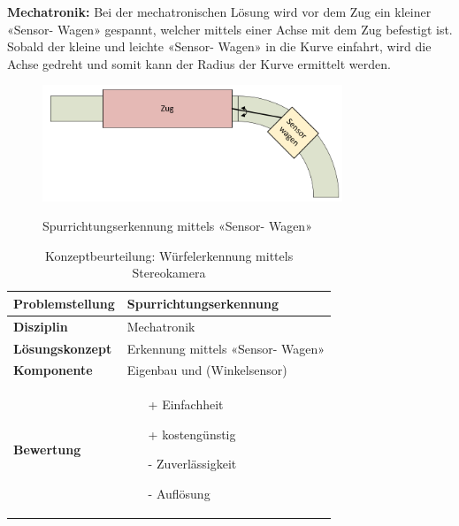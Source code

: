 \documentclass[../../main.tex]{subfiles}
\begin{document}
    \textbf{Mechatronik: }
    Bei der mechatronischen Lösung wird vor dem Zug ein kleiner «Sensor- Wagen» gespannt, welcher mittels einer Achse
    mit dem Zug befestigt ist. Sobald der kleine und leichte «Sensor- Wagen» in die Kurve einfahrt, wird die Achse gedreht
    und somit kann der Radius der Kurve ermittelt werden.\\
    \begin{figure}[H] %
        \centering
        \includegraphics[width=0.8\textwidth]{spurrichtung_mechatronik.png}
        \label{fig:obj_spurrichtung}
        \caption{Spurrichtungserkennung mittels «Sensor- Wagen»}
    \end{figure}

    \begin{flushleft}
        \begin{table}[H]
        \begin{tabular}{ | l | p{11cm} |}
        \hline
        \textbf{Problemstellung} & Spurrichtungserkennung \\ \hline
        \textbf{Disziplin} & Mechatronik \\ \hline
        \textbf{Lösungskonzept} & Erkennung mittels «Sensor- Wagen» \\ \hline
        \textbf{Komponente} & Eigenbau und (Winkelsensor) \\ \hline
        \textbf{Bewertung} &  \begin{itemize}
                                \item[+] Einfachheit
                                \item[+] kostengünstig
                                \item[-] Zuverlässigkeit
                                \item[-] Auflösung   
                              \end{itemize} \\ \hline
        \end{tabular}
        \caption{Konzeptbeurteilung: Würfelerkennung mittels Stereokamera}
        \label{tab:konzept_wurfel_Stereokamera}
    \end{table}
    \end{flushleft}
\end{document}
